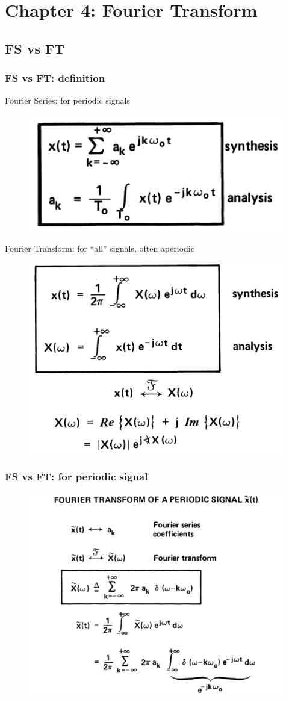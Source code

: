 \documentclass{beamer}
\begin{document}
\section{Chapter 4: Fourier Transform}

\subsection{FS vs FT}

\begin{frame}
    \frametitle{FS vs FT: definition}
    Fourier Series: for periodic signals
    \begin{figure}
        \includegraphics[width=0.4\linewidth]{FS_def}
    \end{figure}
    Fourier Transform: for ``all'' signals, often aperiodic
    \begin{figure}
        \includegraphics[width=0.4\linewidth]{FT_def}
    \end{figure}
\end{frame}


\begin{frame}
    \frametitle{FS vs FT: for periodic signal}
    \begin{figure}
        \includegraphics[width=0.7\linewidth]{FSvsFT}
    \end{figure}
\end{frame}
\end{document}
